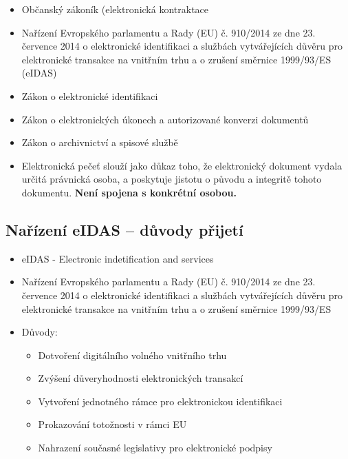 \begin{itemize}
\begin{enumerate}
\begin{itemize}
                        \end{itemize}
            \end{enumerate}
      \item Občanský zákoník (elektronická kontraktace
      \item Nařízení Evropského parlamentu a Rady (EU) č. 910/2014 ze dne 23. července 2014 o elektronické identifikaci
            a službách vytvářejících důvěru pro elektronické transakce na vnitřním trhu a o zrušení směrnice 1999/93/ES
            (eIDAS)
      \item Zákon o elektronické identifikaci
      \item Zákon o elektronických úkonech a autorizované konverzi dokumentů
      \item Zákon o archivnictví a spisové službě
      \item  Elektronická pečeť slouží jako důkaz toho, že elektronický dokument vydala určitá právnická osoba, a poskytuje jistotu o původu a integritě tohoto dokumentu. \textbf{Není spojena s konkrétní osobou.}
\end{itemize}


\subsection{Nařízení eIDAS -- důvody přijetí}
\begin{itemize}
      \item eIDAS - Electronic indetification and services
      \item Nařízení Evropského parlamentu a Rady (EU) č. 910/2014 ze dne 23. července 2014 o elektronické identifikaci
            a službách vytvářejících důvěru pro elektronické transakce na vnitřním trhu a o zrušení směrnice 1999/93/ES
      \item Důvody:
            \begin{itemize}
                  \item  Dotvoření digitálního volného vnitřního trhu
                  \item Zvýšení důveryhodnosti elektronických transakcí
                  \item Vytvoření jednotného rámce pro elektronickou identifikaci
                  \item Prokazování totožnosti v rámci EU
                  \item Nahrazení současné legislativy pro elektronické podpisy
            \end{itemize}
\end{itemize}


